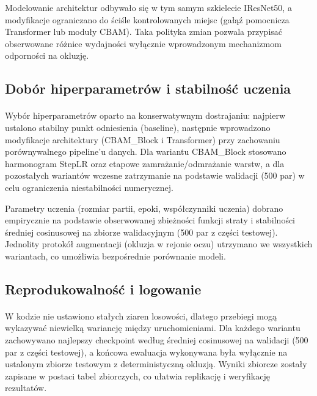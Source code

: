 Modelowanie architektur odbywało się w tym samym szkielecie IResNet50, a modyfikacje ograniczano do ściśle kontrolowanych miejsc (gałąź pomocnicza Transformer lub moduły CBAM). Taka polityka zmian pozwala przypisać obserwowane różnice wydajności wyłącznie wprowadzonym mechanizmom odporności na okluzję.

\subsection{Dobór hiperparametrów i stabilność uczenia}
\paragraph{}Wybór hiperparametrów oparto na konserwatywnym dostrajaniu: najpierw ustalono stabilny punkt odniesienia (baseline), następnie wprowadzono modyfikacje architektury (CBAM\_Block i Transformer) przy zachowaniu porównywalnego pipeline’u danych. Dla wariantu CBAM\_Block stosowano harmonogram StepLR oraz etapowe zamrażanie/odmrażanie warstw, a dla pozostałych wariantów wczesne zatrzymanie na podstawie walidacji (500 par) w celu ograniczenia niestabilności numerycznej.

Parametry uczenia (rozmiar partii, epoki, współczynniki uczenia) dobrano empirycznie na podstawie obserwowanej zbieżności funkcji straty i stabilności średniej cosinusowej na zbiorze walidacyjnym (500 par z części testowej). Jednolity protokół augmentacji (okluzja w rejonie oczu) utrzymano we wszystkich wariantach, co umożliwia bezpośrednie porównanie modeli.

\subsection{Reprodukowalność i logowanie}
\paragraph{}W kodzie nie ustawiono stałych ziaren losowości, dlatego przebiegi mogą wykazywać niewielką wariancję między uruchomieniami. Dla każdego wariantu zachowywano najlepszy checkpoint według średniej cosinusowej na walidacji (500 par z części testowej), a końcowa ewaluacja wykonywana była wyłącznie na ustalonym zbiorze testowym z deterministyczną okluzją. Wyniki zbiorcze zostały zapisane w postaci tabel zbiorczych, co ułatwia replikację i weryfikację rezultatów.